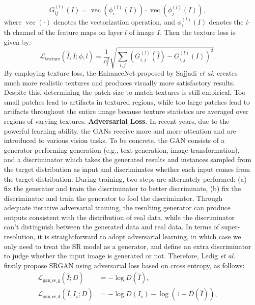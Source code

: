 {\begin{equation}
    G^{(l)}_{ij}(I) = \operatorname{vec}(\phi_i^{(l)}(I)) \cdot \operatorname{vec}(\phi_j^{(l)}(I)) ,
\end{equation}
where $\operatorname{vec}(\cdot)$ denotes the vectorization operation, and $\phi_i^{(l)}(I)$ denotes the $i$-th channel of the feature maps on layer $l$ of image $I$.
Then the texture loss is given by:
\begin{equation}
    \mathcal{L}_{\text{texture}} (\hat{I}, I ; \phi, l) = \frac{1}{c_l^2} \sqrt{\sum_{i,j} (G^{(l)}_{i,j}(\hat{I}) - G^{(l)}_{i,j}(I))^2} .
\end{equation}
By employing texture loss, the EnhanceNet  proposed by Sajjadi \textit{et al.} creates much more realistic textures and produces visually more satisfactory results.
Despite this, determining the patch size to match textures is still empirical.
Too small patches lead to artifacts in textured regions, while too large patches lead to artifacts throughout the entire image because texture statistics are averaged over regions of varying textures.
\textbf{Adversarial Loss.}
In recent years, due to the powerful learning ability, the GANs  receive more and more attention and are introduced to various vision tasks.
To be concrete, the GAN consists of a generator performing generation (e.g., text generation, image transformation), and a discriminator which takes the generated results and instances sampled from the target distribution as input and discriminates whether each input comes from the target distribution.
During training, two steps are alternately performed:
(a) fix the generator and train the discriminator to better discriminate,
(b) fix the discriminator and train the generator to fool the discriminator.
Through adequate iterative adversarial training, the resulting generator can produce outputs consistent with the distribution of real data, while the discriminator can't distinguish between the generated data and real data.
In terms of super-resolution, it is straightforward to adopt adversarial learning, in which case we only need to treat the SR model as a generator, and define an extra discriminator to judge whether the input image is generated or not.
Therefore, Ledig \textit{et al.}  firstly propose SRGAN using adversarial loss based on cross entropy, as follows:
\begin{align}
    \mathcal{L}_{\text{gan\_ce\_g}} (\hat{I} ; D) &= - \log D(\hat{I}) , \\
    \mathcal{L}_{\text{gan\_ce\_d}} (\hat{I}, I_s ; D) &= - \log D(I_s) - \log (1 - D(\hat{I})) ,

\end{align}}
